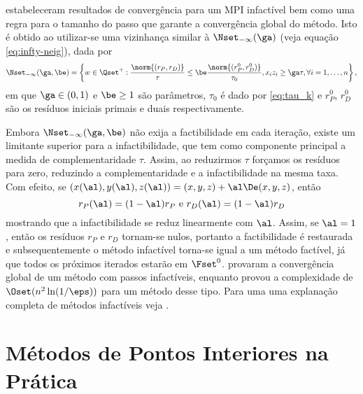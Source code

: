 \citet{Kojima:1993fe}
estabeleceram resultados de convergência para um \ac{MPI} infactível bem como uma regra para o
tamanho do passo que garante a convergência global do método. Isto é obtido ao
utilizar-se uma vizinhança similar à $\Nset_{-\infty}(\ga)$ (veja equação \eqref{eq:infty-neig}), dada por 
\begin{equation}
\label{eq:infeasible-infty-neig}
\Nset_{-\infty}(\ga,\be) = \left\{w \in\Qset^+ :\frac{\norm{(r_P,r_D)}}{\tau} \leq
\be\frac{\norm{(r^0_P,r^0_D)}}{\tau_0}, 
x_iz_i\geq \ga\tau,\forall i =1,\dotsc,n \right\}, 
\end{equation}
em que $\ga \in(0,1)$ e $\be\geq 1$ são
parâmetros, $\tau_0$ é dado por \eqref{eq:tau_k} e  $r^0_P$, $r^0_D$ são os
resíduos iniciais primais e duais respectivamente.

 
Embora $\Nset_{-\infty}(\ga,\be)$ não exija a factibilidade em cada iteração,
 existe um limitante superior para a infactibilidade,  que tem como
componente principal a medida de  complementaridade $\tau$.
Assim, ao reduzirmos $\tau$ forçamos os resíduos para zero,  reduzindo
a complementaridade e a infactibilidade na mesma taxa. Com efeito, se
$(x(\al),y(\al),z(\al)) = (x,y,z) + \al\De(x,y,z)$, então 
\[
r_P(\al) = (1-\al)r_P \text{ e } 
r_D(\al) = (1-\al)r_D
\]
mostrando que a infactibilidade se reduz linearmente com $\al$.  Assim, se $\al
= 1$, então os resíduos $r_P$ e $r_D$ tornam-se nulos, portanto a factibilidade é
restaurada e  subsequentemente o método infactível torna-se igual a um método
factível, já que todos os próximos iterados estarão em $\Fset^0$.
\citet{Kojima:1993fe} provaram a convergência global de um método com passos
infactíveis, enquanto \citet{Zhang:2006ic} provou  a complexidade  de $\Oset(
n^2 \ln ( 1/\eps ) )$ para um método desse tipo. Para uma uma explanação
completa de métodos infactíveis veja \citet[cap. 6]{Wright:Primal-dual-interior-point:1997h}. 



 
 

 


\section{Métodos de Pontos Interiores na Prática}

